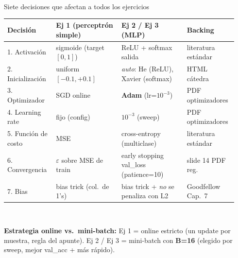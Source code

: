 \documentclass[11pt,aspectratio=169]{beamer}
\begin{document}
\begin{frame}{Siete decisiones que afectan a todos los ejercicios}
\centering\footnotesize
\begin{tabular}{@{}p{0.20\linewidth}p{0.27\linewidth}p{0.27\linewidth}p{0.20\linewidth}@{}}
\toprule
\textbf{Decisión} & \textbf{Ej 1 (perceptrón simple)} & \textbf{Ej 2 / Ej 3 (MLP)} & \textbf{Backing} \\
\midrule
1. Activación        & sigmoide (target $[0,1]$)  & ReLU + softmax salida & literatura estándar \\
\rowcolor{bgbox}
2. Inicialización    & uniform $[-0.1,+0.1]$      & \emph{auto}: He (ReLU), Xavier (softmax) & HTML cátedra \\
3. Optimizador       & SGD online                  & \textbf{Adam} (lr=$10^{-3}$) & PDF optimizadores \\
\rowcolor{bgbox}
4. Learning rate     & fijo (config)              & \textbf{$10^{-3}$} (sweep) & PDF optimizadores \\
5. Función de costo  & MSE                         & cross-entropy (multiclase) & literatura estándar \\
\rowcolor{bgbox}
6. Convergencia      & $\varepsilon$ sobre MSE de train & early stopping val\_loss (patience=10) & slide 14 PDF reg. \\
7. Bias              & bias trick (col.\ de 1's)  & bias trick + \emph{no} se penaliza con L2 & Goodfellow Cap.~7 \\
\bottomrule
\end{tabular}\\[0.6em]

\begin{insight}
\textbf{Estrategia online vs.\ mini-batch:} Ej 1 = online estricto (un update por muestra, regla del apunte). Ej 2 / Ej 3 = mini-batch con \textbf{B=16} (elegido por sweep, mejor val\_acc + más rápido).
\end{insight}
\end{frame}
\end{document}

